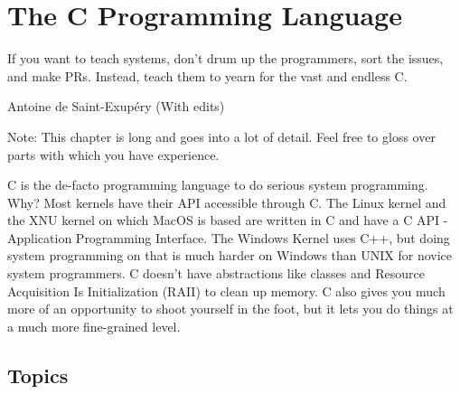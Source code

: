 \chapter{The C Programming Language}

\epigraph{If you want to teach systems, don't drum up the programmers, sort the issues, and make PRs. Instead, teach them to yearn for the vast and endless C.}{Antoine de Saint-Exup\'{e}ry (With edits)}

Note: This chapter is long and goes into a lot of detail. Feel free to gloss over parts with which you have experience.

C is the de-facto programming language to do serious system programming.
Why?
Most kernels have their API accessible through C.
The Linux kernel \cite{Love} and the XNU kernel \cite{xnukernel} on which MacOS is based are written in C and have a C API - Application Programming Interface.
The Windows Kernel uses C++, but doing system programming on that is much harder on Windows than UNIX for novice system programmers.
C doesn't have abstractions like classes and Resource Acquisition Is Initialization (RAII) to clean up memory.
C also gives you much more of an opportunity to shoot yourself in the foot, but it lets you do things at a much more fine-grained level.











\section{Topics}

